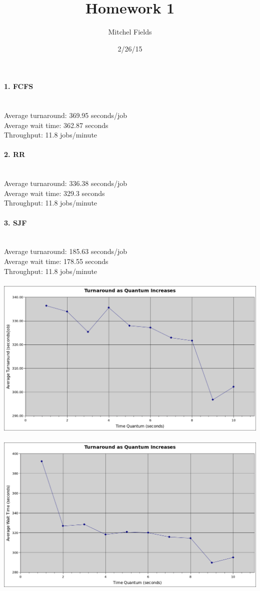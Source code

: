 \documentclass{article}
\begin{document}
\title{Homework 1}
\author{Mitchel Fields}
\date{2/26/15}
\maketitle

\paragraph{1. FCFS}\mbox{}\\
Average turnaround: 369.95 seconds/job\\
Average wait time: 362.87 seconds\\
Throughput: 11.8 jobs/minute

\paragraph{2. RR}\mbox{}\\
Average turnaround: 336.38 seconds/job\\
Average wait time: 329.3 seconds\\
Throughput: 11.8 jobs/minute

\paragraph{3. SJF}\mbox{}\\
Average turnaround: 185.63 seconds/job\\
Average wait time: 178.55 seconds\\
Throughput: 11.8 jobs/minute\\\\
\includegraphics[width=\linewidth]{TurnaroundQuantum}\\\\
\includegraphics[width=\linewidth]{WaitTimeQuantum}
\end{document}

